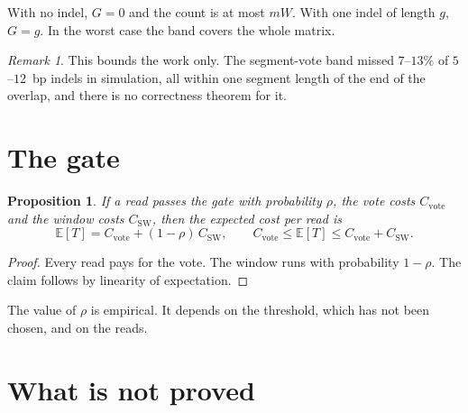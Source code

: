 \documentclass[11pt]{article}
\theoremstyle{plain}
\newtheorem{proposition}[theorem]{Proposition}
\theoremstyle{definition}
\theoremstyle{remark}
\newtheorem*{remark}{Remark}
\begin{document}
With no indel, $G = 0$ and the count is at most $mW$. With one indel of length
$g$, $G = g$. In the worst case the band covers the whole matrix.

\begin{remark}
This bounds the work only. The segment-vote band missed $7$--$13\%$ of
$5$--$12$~bp indels in simulation, all within one segment length of the end of
the overlap, and there is no correctness theorem for it.
\end{remark}

\section{The gate}

\begin{proposition}\label{prop:gate}
If a read passes the gate with probability $\rho$, the vote costs
$C_{\mathrm{vote}}$ and the window costs $C_{\mathrm{SW}}$, then the expected
cost per read is
\[
\mathbb{E}[T] = C_{\mathrm{vote}} + (1 - \rho)\,C_{\mathrm{SW}},
\qquad
C_{\mathrm{vote}} \le \mathbb{E}[T] \le C_{\mathrm{vote}} + C_{\mathrm{SW}} .
\]
\end{proposition}

\begin{proof}
Every read pays for the vote. The window runs with probability $1 - \rho$. The
claim follows by linearity of expectation.
\end{proof}

The value of $\rho$ is empirical. It depends on the threshold, which has not
been chosen, and on the reads.

\section{What is not proved}\label{sec:open}
\end{document}
